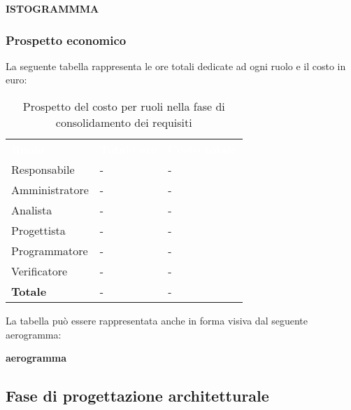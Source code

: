 \textbf{ISTOGRAMMMA}

\subsubsection{Prospetto economico}
La seguente tabella rappresenta le ore totali dedicate ad ogni ruolo e il costo in euro:

\begin{table}[!htbp]
\begin{center}
\renewcommand{\arraystretch}{1.5}
\begin{tabular}{ m{}<{\centering}  m{}<{\centering} m{}<{\centering}}
	\rowcolor{darkblue}
	\textcolor{white}{\textbf{Ruolo}}&\textcolor{white}{\textbf{Totale ore}}&\textcolor{white}{\textbf{Costo totale}}\\ 

	Responsabile  & - & - \\	

	\rowcolor{gray!10} Amministratore & - & - \\
	
	Analista & - & - \\
	
	\rowcolor{gray!10} Progettista & - & - \\
	
	Programmatore & - & - \\
	
	\rowcolor{gray!10} Verificatore & - & - \\
	
	\textbf{Totale} & - & - \\
	
\end{tabular}
\caption{Prospetto del costo per ruoli nella fase di consolidamento dei requisiti}
\end{center}
\end{table}

La tabella può essere rappresentata anche in forma visiva dal seguente aerogramma:

\textbf{aerogramma}



\subsection{Fase di progettazione architetturale}

